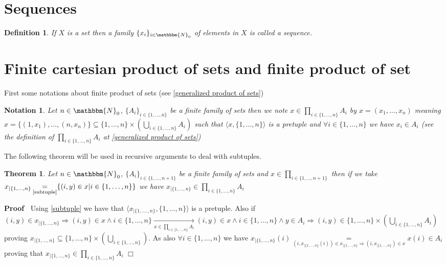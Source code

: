 \documentclass{book}
\newcommand{\Rightarrowlim}{\mathop{\rightarrow}\limits}
\newcommand{\equallim}{\mathop{=}\limits}
\newenvironment{proof}{\noindent\textbf{Proof\ }}{\hspace*{\fill}$\Box$\medskip}
\newtheorem{definition}{Definition}
{\theorembodyfont{\rmfamily}\newtheorem{example}{Example}}
\newtheorem{notation}{Notation}
{\theorembodyfont{\rmfamily}\newtheorem{note}{Note}}
\newtheorem{theorem}{Theorem}
\begin{document}
{{\

\section{Sequences}

\begin{definition}
  \label{sequence}{}If $X$ is a set then a family $\{ x_i
  \}_{i \in \mathbbm{N}_0}$ of elements in $X$ is called a sequence.
\end{definition}

\section{Finite cartesian product of sets and finite product of set}

First some notations about finite product of sets (see \ref{generalized
product of sets})

\begin{notation}
  Let $n \in \mathbbm{N}_0$, $\{ A_i \}_{i \in \{ 1, \ldots, n \}}$ be a
  finite family of sets then we note $x \in \prod_{i \in \{ 1, \ldots, n \}}
  A_i$ by $x = (x_1, \ldots, x_n)$ meaning $x = \{ (1, x_1), \ldots, (n, x_n)
  \} \subseteq \{ 1, \ldots, n \} \times \left( \bigcup_{i \in \{ 1, \ldots, n
  \}} A_i \right)$ such that $\langle x, \{ 1, \ldots, n \} \rangle$ is a
  pretuple and $\forall i \in \{ 1, \ldots, n \}$ we have $x_i \in A_i$ (see
  the definition of $\prod_{i \in \{ 1, \ldots, n \}} A_i$ at \ref{generalized
  product of sets})
\end{notation}

The following theorem will be used in recursive arguments to deal with
subtuples.

\begin{theorem}
  \label{subtuple of product of sets}Let $n \in \mathbbm{N}_0$, $\{ A_i \}_{i
  \in \{ 1, \ldots, n + 1 \}}$ be a finite family of sets and $x \in \prod_{i
  \in \{ 1, \ldots, n + 1 \}}$ then if we take \ $x_{| \{ 1, \ldots, n \}}
  \equallim_{\text{\ref{subtuple}}} \{ (i, y) \in x|i \in \{ 1, \ldots, n \}
  \}$ we have $x_{| \{ 1, \ldots, n \}} \in \prod_{i \in \{ 1, \ldots, n \}}
  A_i$
\end{theorem}

\begin{proof}
  Using \ref{subtuple} we have that $\langle x_{| \{ 1, \ldots ., n \}}, \{ 1,
  \ldots, n \} \rangle$ is a pretuple. Also if $(i, y) \in x_{| \{ 1, \ldots,
  n \}} \Rightarrow (i, y) \in x \wedge i \in \{ 1, \ldots, n \}
  \Rightarrowlim_{x \in \prod_{i \in \{ 1, \ldots, n \}} A_i} (i, y) \in x
  \wedge i \in \{ 1, \ldots, n \} \wedge y \in A_i \Rightarrow (i, y) \in \{
  1, \ldots, n \} \times \left( \bigcup_{i \in \{ 1, \ldots, n \}} A_i
  \right)$ proving $x_{| \{ 1, \ldots, n \}} \subseteq \{ 1, \ldots, n \}
  \times \left( \bigcup_{i \in \{ 1, \ldots, n \}} \right)$. As also $\forall
  i \in \{ 1, \ldots, n \}$ we have $x_{| \{ 1, \ldots, n \}} (i)
  \equallim_{(i, x_{| \{ 1, \ldots, n \}} (i)) \in x_{| \{ 1, \ldots, n \}}
  \Rightarrow (i, x_{| \{ 1, \ldots, n \}}) \in x} x (i) \in A_i$ proving that
  $x_{| \{ 1, \ldots, n \}} \in \prod_{i \in \{ 1, \ldots, n \}} A_i$
\end{proof}

}}
\end{document}
